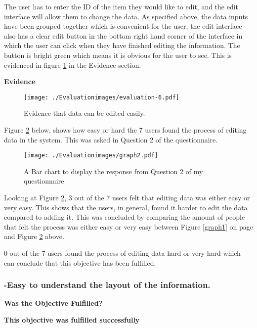   The user has to enter the ID of the item they would like to edit, and the edit interface will allow them to change the data. As specified above, the data inputs have been grouped together which is convenient for the user, the edit interface also has a clear edit button in the bottom right hand corner of the interface in which the user can click when they have finished editing the information. The button is bright green which means it is obvious for the user to see. This is evidenced in figure \ref{fig:evaluation-6} in the Evidence section.\newline

\textbf{Evidence} \newline

\begin{figure}[H]
\caption{Evidence that data can be edited easily.} \label{fig:evaluation-6}
\hfill\texttt{[image: ./Evaluationimages/evaluation-6.pdf]}
\end{figure}

Figure \ref{graph2} below, shows how easy or hard the 7 users found the process of editing data in the system. This was asked in Question 2 of the questionnaire.

\begin{figure}[H]
\caption{A Bar chart to display the response from Question 2 of my questionnaire} \label{graph2}
\hfill\texttt{[image: ./Evaluationimages/graph2.pdf]}
\end{figure}

Looking at Figure \ref{graph2}, 3 out of the 7 users felt that editing data was either easy or very easy. This shows that the users, in general, found it harder to edit the data compared to adding it. This was concluded by comparing the amount of people that felt the process was either easy or very easy between Figure \ref{graph1} on page \pageref{graph1} and Figure \ref{graph2} above.

0 out of the 7 users found the process of editing data hard or very hard which can conclude that this objective has been fulfilled.




\pagebreak
\subsubsection{-Easy to understand the layout of the information.}
\textbf{Was the Objective Fulfilled?} \newline

\textbf{\large{This objective was fulfilled successfully}}

